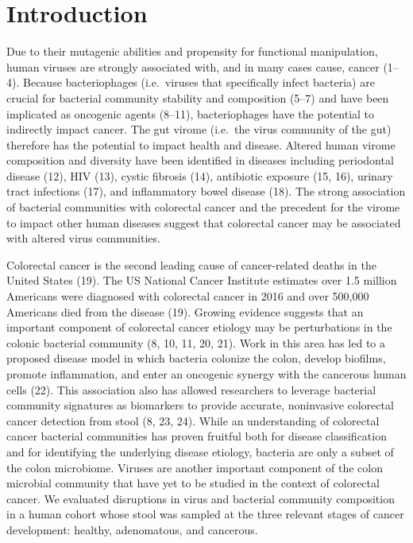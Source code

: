 \documentclass[12pt,]{article}
\begin{document}
\newpage

\section{Introduction}\label{introduction}

Due to their mutagenic abilities and propensity for functional
manipulation, human viruses are strongly associated with, and in many
cases cause, cancer (1--4). Because bacteriophages (i.e.~viruses that
specifically infect bacteria) are crucial for bacterial community
stability and composition (5--7) and have been implicated as oncogenic
agents (8--11), bacteriophages have the potential to indirectly impact
cancer. The gut virome (i.e.~the virus community of the gut) therefore
has the potential to impact health and disease. Altered human virome
composition and diversity have been identified in diseases including
periodontal disease (12), HIV (13), cystic fibrosis (14), antibiotic
exposure (15, 16), urinary tract infections (17), and inflammatory bowel
disease (18). The strong association of bacterial communities with
colorectal cancer and the precedent for the virome to impact other human
diseases suggest that colorectal cancer may be associated with altered
virus communities.

Colorectal cancer is the second leading cause of cancer-related deaths
in the United States (19). The US National Cancer Institute estimates
over 1.5 million Americans were diagnosed with colorectal cancer in 2016
and over 500,000 Americans died from the disease (19). Growing evidence
suggests that an important component of colorectal cancer etiology may
be perturbations in the colonic bacterial community (8, 10, 11, 20, 21).
Work in this area has led to a proposed disease model in which bacteria
colonize the colon, develop biofilms, promote inflammation, and enter an
oncogenic synergy with the cancerous human cells (22). This association
also has allowed researchers to leverage bacterial community signatures
as biomarkers to provide accurate, noninvasive colorectal cancer
detection from stool (8, 23, 24). While an understanding of colorectal
cancer bacterial communities has proven fruitful both for disease
classification and for identifying the underlying disease etiology,
bacteria are only a subset of the colon microbiome. Viruses are another
important component of the colon microbial community that have yet to be
studied in the context of colorectal cancer. We evaluated disruptions in
virus and bacterial community composition in a human cohort whose stool
was sampled at the three relevant stages of cancer development: healthy,
adenomatous, and cancerous.
\end{document}
